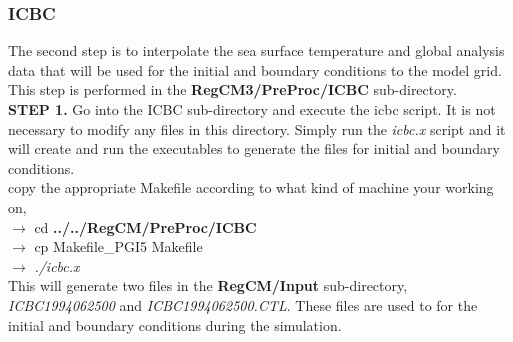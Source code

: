 \subsubsection{ICBC}
\noindent
The second step is to interpolate the sea surface temperature and global analysis data that will be used for the initial and boundary conditions to the model grid.  This step is performed in the {\bf RegCM3/PreProc/ICBC} sub-directory.  \\

\noindent
{\bf STEP 1.}  Go into the ICBC sub-directory and execute the icbc script. It is not necessary to modify any files in this directory.  Simply run the {\it icbc.x} script and it will create and run the executables to generate the files for initial and boundary conditions.   \\

\noindent
copy the appropriate Makefile according to what kind of machine your working on, \\

\indent 
$\rightarrow$ cd {\bf ../../RegCM/PreProc/ICBC} \\
\indent 
$\rightarrow$   {cp Makefile\_PGI5 Makefile} \\ 
\indent 
$\rightarrow$   {\it ./icbc.x} \\

\noindent
This will generate two files in the {\bf RegCM/Input} 
sub-directory, {\it ICBC1994062500} and {\it ICBC1994062500.CTL}. 
These files are used to 
for the initial and boundary conditions during the simulation.


